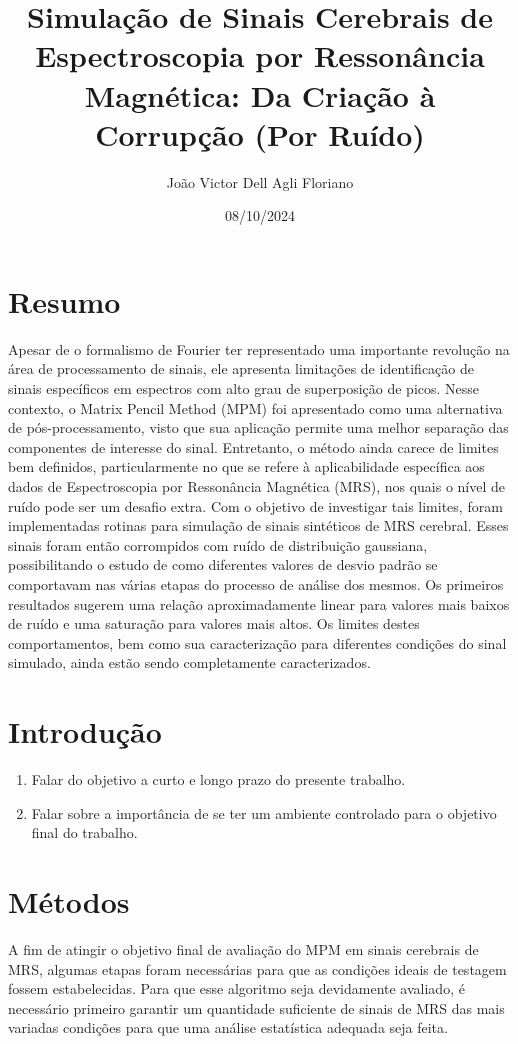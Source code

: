 \documentclass{article}
\title{ Simulação de Sinais Cerebrais de Espectroscopia por 
Ressonância Magnética: Da Criação à Corrupção (Por Ruído)}
\author{João Victor Dell Agli Floriano}
\date{08/10/2024}
\begin{document}
\maketitle

\section{Resumo}
Apesar de o formalismo de Fourier ter representado uma importante revolução na área de processamento 
de sinais, ele apresenta limitações de identificação de sinais específicos em espectros com alto grau 
de superposição de picos. Nesse contexto, o Matrix Pencil Method (MPM) foi apresentado como uma 
alternativa de pós-processamento, visto que sua aplicação permite uma melhor separação das componentes 
de interesse do sinal.  Entretanto, o método ainda carece de limites bem definidos, particularmente no 
que se refere à aplicabilidade específica aos dados de Espectroscopia por Ressonância Magnética (MRS), 
nos quais o nível de ruído pode ser um desafio extra. Com o objetivo de investigar tais limites, foram 
implementadas rotinas para simulação de sinais sintéticos de MRS cerebral. Esses sinais foram então 
corrompidos com ruído de distribuição gaussiana, possibilitando o estudo de como diferentes valores de 
desvio padrão se comportavam nas várias etapas do processo de análise dos mesmos. Os primeiros resultados 
sugerem uma relação aproximadamente linear para valores mais baixos de ruído e uma saturação para valores 
mais altos. Os limites destes comportamentos, bem como sua caracterização para diferentes condições do sinal 
simulado, ainda estão sendo completamente caracterizados.
\section{Introdução}

\begin{enumerate}
    \item Falar do objetivo a curto e longo prazo do presente trabalho.
    \item Falar sobre a importância de se ter um ambiente controlado para o objetivo final do trabalho. 
\end{enumerate}

\section{Métodos}

A fim de atingir o objetivo final de avaliação do MPM em sinais cerebrais de MRS, algumas etapas foram 
necessárias para que as condições ideais de testagem fossem estabelecidas. Para que esse algoritmo 
seja devidamente avaliado, é necessário primeiro garantir um quantidade suficiente de sinais de 
MRS das mais variadas condições para que uma análise estatística adequada seja feita. 
\end{document}
